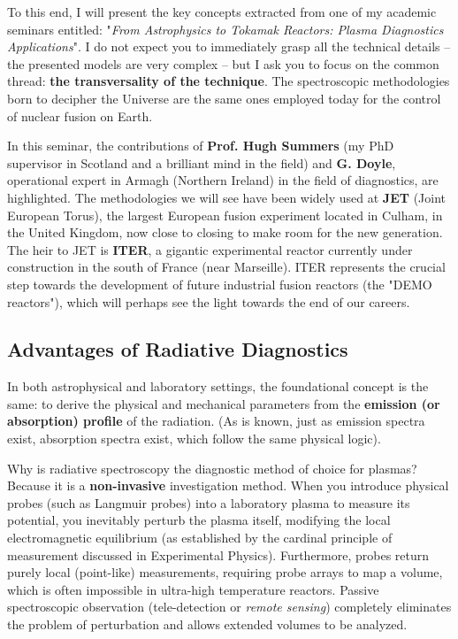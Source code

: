 To this end, I will present the key concepts extracted from one of my academic seminars entitled: "\textit{From Astrophysics to Tokamak Reactors: Plasma Diagnostics Applications}".
I do not expect you to immediately grasp all the technical details – the presented models are very complex – but I ask you to focus on the common thread: \textbf{the transversality of the technique}. The spectroscopic methodologies born to decipher the Universe are the same ones employed today for the control of nuclear fusion on Earth.

In this seminar, the contributions of \textbf{Prof. Hugh Summers} (my PhD supervisor in Scotland and a brilliant mind in the field) and \textbf{G. Doyle}, operational expert in Armagh (Northern Ireland) in the field of diagnostics, are highlighted. The methodologies we will see have been widely used at \textbf{JET} (Joint European Torus), the largest European fusion experiment located in Culham, in the United Kingdom, now close to closing to make room for the new generation. The heir to JET is \textbf{ITER}, a gigantic experimental reactor currently under construction in the south of France (near Marseille). ITER represents the crucial step towards the development of future industrial fusion reactors (the "DEMO reactors"), which will perhaps see the light towards the end of our careers.

    \subsection{Advantages of Radiative Diagnostics}
    
    In both astrophysical and laboratory settings, the foundational concept is the same: to derive the physical and mechanical parameters from the \textbf{emission (or absorption) profile} of the radiation. (As is known, just as emission spectra exist, absorption spectra exist, which follow the same physical logic).
    
    Why is radiative spectroscopy the diagnostic method of choice for plasmas?
    Because it is a \textbf{non-invasive} investigation method.
    When you introduce physical probes (such as Langmuir probes) into a laboratory plasma to measure its potential, you inevitably perturb the plasma itself, modifying the local electromagnetic equilibrium (as established by the cardinal principle of measurement discussed in Experimental Physics). Furthermore, probes return purely local (point-like) measurements, requiring probe arrays to map a volume, which is often impossible in ultra-high temperature reactors.
    Passive spectroscopic observation (tele-detection or \textit{remote sensing}) completely eliminates the problem of perturbation and allows extended volumes to be analyzed.
    
